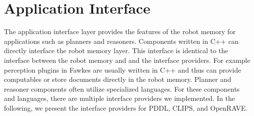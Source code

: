 \section{Application Interface}
\label{sec:impl-planner}
The application interface layer provides the features of the robot
memory for applications such as planners and reasoners. Components
written in C++ can directly interface the robot memory layer.
This interface is identical to the interface between the
robot memory and and the interface providers. For example perception
plugins in Fawkes are usually written in C++ and thus can provide
computables or store documents directly in the robot memory. Planner
and reasoner components often utilize specialized languages. For these
components and languages, there are multiple interface providers we
implemented. In the following, we present the interface providers for
PDDL, CLIPS, and OpenRAVE.

